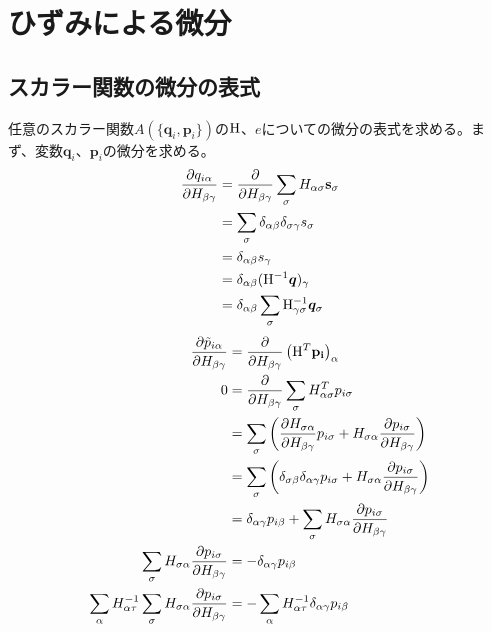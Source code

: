 \documentclass[11pt,a4paper,uplatex]{jsarticle}
\begin{document}
\section{ひずみによる微分}
\subsection{スカラー関数の微分の表式}
任意のスカラー関数$A(\{\bm{q}_{i}, \bm{p}_{i}\})$の${\rm H}$、$e$についての微分の表式を求める。まず、変数$\bm{q}_{i}$、$\bm{p}_{i}$の微分を求める。
\begin{align}
    \frac{\partial q_{i \alpha}}{\partial H_{\beta \gamma}} 
    &= \frac{\partial}{\partial H_{\beta \gamma}} \sum_{\sigma} H_{\alpha \sigma} \bf{s}_{\sigma} \\
    &= \sum_{\sigma} \delta_{\alpha \beta} \delta_{\sigma \gamma} s_{\sigma} \\
    &= \delta_{\alpha \beta} s_{\gamma} \\
    &= \delta_{\alpha \beta} ({\rm H}^{-1} \bm{q})_{\gamma} \\
    &= \delta_{\alpha \beta} \sum_{\sigma} {\rm H}^{-1}_{\gamma \sigma} \bm{q}_{\sigma}
\end{align}
\begin{align}
    \frac{\partial \tilde{ p}_{i \alpha} }{\partial H_{\beta \gamma}} 
    &= \frac{\partial }{\partial H_{\beta \gamma}} \left({\rm H}^{T} \bf{p}_{i}\right)_{\alpha} \\
    0 &= \frac{\partial }{\partial H_{\beta \gamma}} \sum_{\sigma} H^{T}_{\alpha \sigma} p_{i \sigma}\\
    &= \sum_{\sigma} \left( \frac{\partial H_{\sigma \alpha} }{\partial H_{\beta \gamma}} p_{i \sigma}  +  H_{\sigma \alpha} \frac{\partial  p_{i \sigma}}{\partial H_{\beta \gamma}} \right) \\
    &= \sum_{\sigma} \left( \delta_{\sigma \beta} \delta_{\alpha \gamma} p_{i \sigma}  +  H_{\sigma \alpha} \frac{\partial  p_{i \sigma}}{\partial H_{\beta \gamma}} \right) \\
    &= \delta_{\alpha \gamma} p_{i \beta} + \sum_{\sigma} H_{\sigma \alpha} \frac{\partial  p_{i \sigma}}{\partial H_{\beta \gamma}}\\
    \sum_{\sigma} H_{\sigma \alpha} \frac{\partial  p_{i \sigma}}{\partial H_{\beta \gamma}} &= - \delta_{\alpha \gamma} p_{i \beta} \\
    \sum_{\alpha} H^{-1}_{\alpha \tau} \sum_{\sigma} H_{\sigma \alpha} \frac{\partial  p_{i \sigma}}{\partial H_{\beta \gamma}} &= - \sum_{\alpha} H^{-1}_{\alpha \tau}  \delta_{\alpha \gamma} p_{i \beta}  
\end{align}
\end{document}

